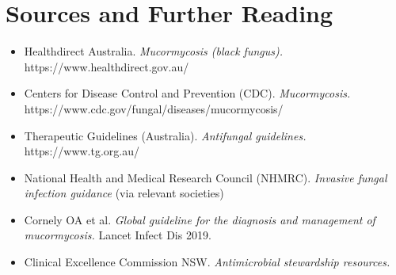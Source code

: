 \section*{Sources and Further Reading}
\begin{itemize}
    \item Healthdirect Australia. \textit{Mucormycosis (black fungus).} https://www.healthdirect.gov.au/
    \item Centers for Disease Control and Prevention (CDC). \textit{Mucormycosis.} https://www.cdc.gov/fungal/diseases/mucormycosis/
    \item Therapeutic Guidelines (Australia). \textit{Antifungal guidelines.} https://www.tg.org.au/
    \item National Health and Medical Research Council (NHMRC). \textit{Invasive fungal infection guidance} (via relevant societies)
    \item Cornely OA et al. \textit{Global guideline for the diagnosis and management of mucormycosis.} Lancet Infect Dis 2019.
    \item Clinical Excellence Commission NSW. \textit{Antimicrobial stewardship resources.}
\end{itemize}

\clearpage
